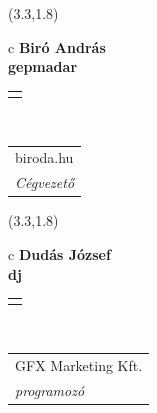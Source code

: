 \documentclass[11pt]{article}
\begin{document}
\makebox(3.3,1.8){
  \renewcommand\arraystretch{1.3}
  \begin{tabular}[c]{c}
    \hspace{8.5mm}
    \LARGE\bf{ Biró András }\\
    \hspace{8.5mm}
    \Large{ gepmadar }\\
    \renewcommand\arraystretch{3}
    \begin{tabular}[c]{c}
      \centering
      \fontfamily{phv}\selectfont{
        \textbf{
          \textsc{
            \scriptsize{
            \color{Bright}{ Ismerkedő }\color{Dark}{ Webmester }\color{Bright}{ Sminkmester }\color{Bright}{ Programozó }
            }
          }
        }
      }
    \end{tabular}
    \\
    \renewcommand\arraystretch{1}
    \begin{tabular}{p{3.3in}}
      \hspace{.7cm}biroda.hu\\
      \hspace{.7cm}\emph{ Cégvezető }\\
    \end{tabular}
  \end{tabular}
}

\makebox(3.3,1.8){
  \renewcommand\arraystretch{1.3}
  \begin{tabular}[c]{c}
    \hspace{8.5mm}
    \LARGE\bf{ Dudás József }\\
    \hspace{8.5mm}
    \Large{ dj }\\
    \renewcommand\arraystretch{3}
    \begin{tabular}[c]{c}
      \centering
      \fontfamily{phv}\selectfont{
        \textbf{
          \textsc{
            \scriptsize{
            \color{Bright}{ Ismerkedő }\color{Bright}{ Webmester }\color{Bright}{ Sminkmester }\color{Dark}{ Programozó }
            }
          }
        }
      }
    \end{tabular}
    \\
    \renewcommand\arraystretch{1}
    \begin{tabular}{p{3.3in}}
      \hspace{.7cm}GFX Marketing Kft.\\
      \hspace{.7cm}\emph{ programozó }\\
    \end{tabular}
  \end{tabular}
}
\end{document}
